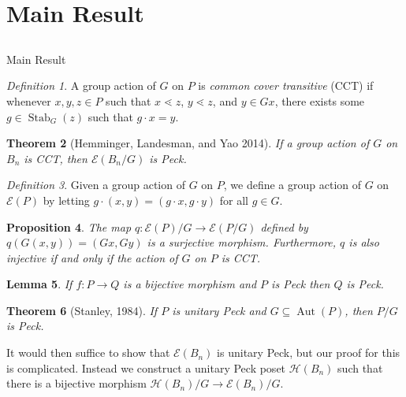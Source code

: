 \documentclass{beamer}
\newtheorem{thm}{Theorem}
\newtheorem{lem}[thm]{Lemma}
\newtheorem{prop}[thm]{Proposition}
\theoremstyle{remark}
\newtheorem{defn}[thm]{Definition}
\def\Stab{\operatorname{Stab}}
\begin{document}

\section{Main Result}
\subsection{}

\begin{frame}{Main Result}
\begin{defn}
A group action of $G$ on $P$ is \textit{common cover transitive} (CCT) if whenever $x,y,z\in P$ such that $x\lessdot z$, $y\lessdot z$, and $y\in Gx$, there exists some $g\in \Stab_G(z)$ such that $g\cdot x = y$.
\end{defn}

\begin{thm}[Hemminger, Landesman, and Yao 2014]
If a group action of $G$ on $B_n$ is CCT, then $\mathcal{E}(B_n/G)$ is Peck.
\end{thm}
\end{frame}








\begin{frame}
\begin{defn}
Given a group action of $G$ on $P$, we define a group action of $G$ on $\mathcal{E}(P)$ by letting $g\cdot (x,y) = (g\cdot x,g\cdot y)$ for all $g\in G$.
\end{defn}
\pause
\begin{prop}
The map $q\colon \mathcal{E}(P)/G\rightarrow \mathcal{E}(P/G)$ defined by $q(G(x,y)) = (Gx,Gy)$ is a surjective morphism.  Furthermore, $q$ is also injective if and only if the action of $G$ on $P$ is CCT.
\end{prop}

\begin{lem}
If $f:P\rightarrow Q$ is a bijective morphism and $P$ is Peck then $Q$ is Peck.
\end{lem}
\end{frame}









\begin{frame}
\begin{thm}[Stanley, 1984]
If $P$ is unitary Peck and $G\subseteq\operatorname{Aut}(P)$, then $P/G$ is Peck.
\end{thm}
It would then suffice to show that $\mathcal{E}(B_n)$ is unitary Peck, but our proof for this is complicated.  Instead we construct a unitary Peck poset $\mathcal{H}(B_n)$ such that there is a bijective morphism $\mathcal{H}(B_n)/G\rightarrow \mathcal{E}(B_n)/G$.

\end{frame}
\end{document}
